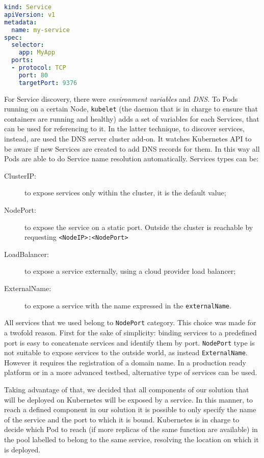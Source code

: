 \begin{lstlisting}[caption={Example of Service definition},
                   captionpos=b, language=yaml, label=chap:impl:lst:srv]
kind: Service
apiVersion: v1
metadata:
  name: my-service
spec:
  selector:
    app: MyApp
  ports:
  - protocol: TCP
    port: 80
    targetPort: 9376
\end{lstlisting}

For Service discovery, there were \emph{environment variables} and \emph{DNS}.
To Pods running on a certain Node, \texttt{kubelet} (the daemon that is in
charge to ensure that containers are running and healthy) adds a set of
variables for each Services, that can be used for referencing to it. In the
latter technique, to discover services, instead, are used the DNS server cluster
add-on. It watches Kubernetes API to be aware if new Services are created to add
DNS records for them. In this way all Pods are able to do Service name
resolution automatically. Services types can be:
\begin{description}
\item[ClusterIP:] to expose services only within the cluster, it is the default
value;
\item[NodePort:] to expose the service on a static port. Outside the cluster is
reachable by requesting \verb!<NodeIP>:<NodePort>!
\item[LoadBalancer:] to expose a service externally, using a cloud provider
load balancer;
\item[ExternalName:] to expose a service with the name expressed in the 
\texttt{externalName}.
\end{description}

All services that we used belong to \texttt{NodePort} category. This choice was
made for a twofold reason. First for the sake of simplicity: binding services to
a predefined port is easy to concatenate services and identify them by port.
\texttt{NodePort} type is not suitable to expose services to the outside world,
as instead \texttt{ExternalName}. However it requires the registration of a
domain name. In a production ready platform or in a more advanced testbed,
alternative type of services can be used.

Taking advantage of that, we decided that all components of our solution that
will be deployed on Kubernetes will be exposed by a service. In this manner, to
reach a defined component in our solution it is possible to only specify the
name of the service and the port to which it is bound. Kubernetes is in charge
to decide which Pod to reach (if more replicas of the same function are
available) in the pool labelled to belong to the same service, resolving the
location on which it is deployed.

